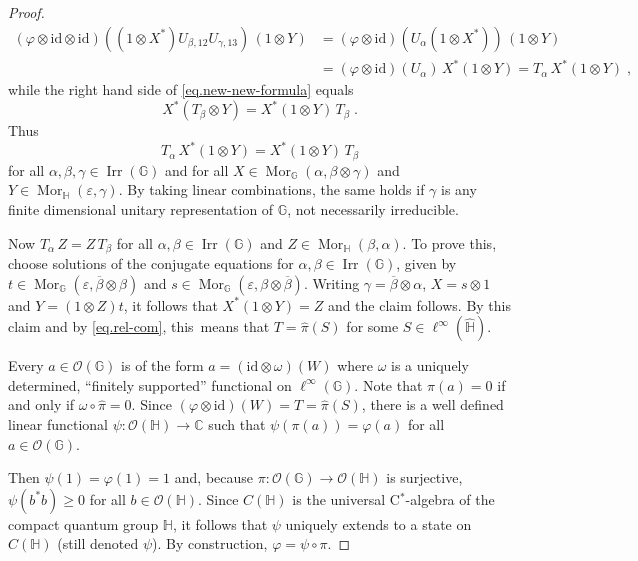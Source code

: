 \documentclass[10pt,a4paper]{amsart}
\begin{document}
\begin{proof}
\begin{align*}
(\varphi \otimes \mathrm{id} \otimes \mathrm{id})((1 \otimes X^*) U_{\beta,12} U_{\gamma,13}) \, (1 \otimes Y) &= (\varphi \otimes \mathrm{id})(U_\alpha (1 \otimes X^*)) \, (1 \otimes Y) \\ &= (\varphi \otimes \mathrm{id})(U_\alpha) \, X^* (1 \otimes Y) = T_\alpha \, X^* (1 \otimes Y) \; ,
\end{align*}
while the right hand side of \eqref{eq.new-new-formula} equals
$$X^* (T_\beta \otimes Y) = X^* (1 \otimes Y) \, T_\beta \; .$$
Thus
$$T_\alpha \, X^*(1 \otimes Y) = X^*(1 \otimes Y) \, T_\beta$$
for all $\alpha,\beta,\gamma \in \operatorname{Irr}(\mathbb{G})$ and for all $X \in \operatorname{Mor}_\mathbb{G}(\alpha,\beta \otimes \gamma)$ and $Y \in \operatorname{Mor}_\mathbb{H}(\varepsilon,\gamma)$. By taking linear combinations, the same holds if $\gamma$ is any finite dimensional unitary representation of $\mathbb{G}$, not necessarily irreducible.

\bigskip


Now $T_\alpha \, Z = Z \, T_\beta$ for all $\alpha,\beta \in \operatorname{Irr}(\mathbb{G})$ and $Z \in \operatorname{Mor}_\mathbb{H}(\beta,\alpha)$. To prove this, choose solutions of the conjugate equations for $\alpha,\beta \in \operatorname{Irr}(\mathbb{G})$, given by $t \in \operatorname{Mor}_\mathbb{G}(\varepsilon,\overline{\beta} \otimes \beta)$ and $s \in \operatorname{Mor}_\mathbb{G}(\varepsilon,\beta \otimes \overline{\beta})$. Writing $\gamma = \overline{\beta} \otimes \alpha$, $X = s \otimes 1$ and $Y = (1 \otimes Z)t$, it follows that $X^*(1 \otimes Y) = Z$ and the claim follows. By this claim and by \eqref{eq.rel-com}, this\ means that $T = \widehat{\pi}(S)$ for some $S \in \ell^\infty(\widehat{\mathbb{H}})$.

\bigskip

Every $a \in \mathcal{O}(\mathbb{G})$ is of the form $a = (\mathrm{id} \otimes \omega)(W)$ where $\omega$ is a uniquely determined, ``finitely supported'' functional on $\ell^\infty(\mathbb{G})$. Note that $\pi(a) = 0$ if and only if $\omega \circ \widehat{\pi} = 0$. Since $(\varphi \otimes \mathrm{id})(W) = T = \widehat{\pi}(S)$,  there is a well defined linear functional $\psi : \mathcal{O}(\mathbb{H}) \to \mathbb{C}$ such that $\psi(\pi(a)) = \varphi(a)$ for all $a \in \mathcal{O}(\mathbb{G})$.

\bigskip

Then $\psi(1) = \varphi(1) = 1$ and, because $\pi : \mathcal{O}(\mathbb{G}) \to \mathcal{O}(\mathbb{H})$ is surjective, $\psi(b^* b) \geq 0$ for all $b \in \mathcal{O}(\mathbb{H})$. Since $C(\mathbb{H})$ is the universal C$^*$-algebra of the compact quantum group $\mathbb{H}$, it follows that $\psi$ uniquely extends to a state on $C(\mathbb{H})$ (still denoted $\psi$). By construction, $\varphi = \psi \circ \pi$.
\end{proof}
\end{document}
